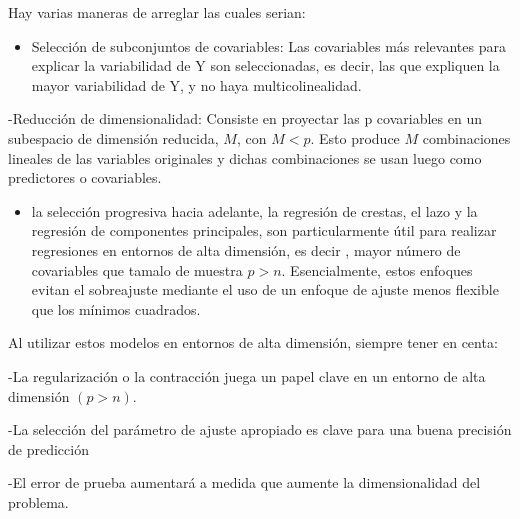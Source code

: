 \documentclass[
]{article}
\providecommand{\tightlist}{%
  \setlength{\itemsep}{0pt}\setlength{\parskip}{0pt}}
\begin{document}
Hay varias maneras de arreglar las cuales serian:

\begin{itemize}
\tightlist
\item
  Selección de subconjuntos de covariables: Las covariables más
  relevantes para explicar la variabilidad de Y son seleccionadas, es
  decir, las que expliquen la mayor variabilidad de Y, y no haya
  multicolinealidad.
\end{itemize}

-Reducción de dimensionalidad: Consiste en proyectar las p covariables
en un subespacio de dimensión reducida, \(M\), con \(M < p\). Esto
produce \(M\) combinaciones lineales de las variables originales y
dichas combinaciones se usan luego como predictores o covariables.

\begin{itemize}
\tightlist
\item
  la selección progresiva hacia adelante, la regresión de crestas, el
  lazo y la regresión de componentes principales, son particularmente
  útil para realizar regresiones en entornos de alta dimensión, es decir
  , mayor número de covariables que tamalo de muestra \(p > n\).
  Esencialmente, estos enfoques evitan el sobreajuste mediante el uso de
  un enfoque de ajuste menos flexible que los mínimos cuadrados.
\end{itemize}

Al utilizar estos modelos en entornos de alta dimensión, siempre tener
en centa:

-La regularización o la contracción juega un papel clave en un entorno
de alta dimensión \((p> n)\).

-La selección del parámetro de ajuste apropiado es clave para una buena
precisión de predicción

-El error de prueba aumentará a medida que aumente la dimensionalidad
del problema.
\end{document}
